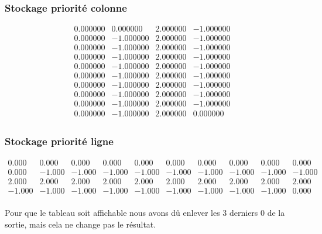 \documentclass[11pt]{article}
\begin{document}
\subsubsection{Stockage priorité colonne}

\begin{equation*}
  \begin{array}{rrrr}
    0.000000 &	0.000000  &	2.000000 &	-1.000000	\\
    0.000000 &	-1.000000 &	2.000000 &	-1.000000	\\
    0.000000 &	-1.000000 &	2.000000 &	-1.000000	\\
    0.000000 &	-1.000000 &	2.000000 &	-1.000000	\\
    0.000000 &	-1.000000 &	2.000000 &	-1.000000	\\
    0.000000 &	-1.000000 &	2.000000 &	-1.000000	\\
    0.000000 &	-1.000000 &	2.000000 &	-1.000000	\\
    0.000000 &	-1.000000 &	2.000000 &	-1.000000	\\
    0.000000 &	-1.000000 &	2.000000 &	-1.000000	\\
    0.000000 &	-1.000000 &	2.000000 &	0.000000	\\
  \end{array}
\end{equation*}

\subsubsection{Stockage priorité ligne}

\begin{equation*}
  \begin{array}{rrrrrrrrrr}
    0.000 &	0.000 &	0.000 &	0.000 &
    0.000 &	0.000 &	0.000 &	0.000 &
    0.000 &	0.000 \\	
    0.000 &	-1.000 &	-1.000 &	-1.000 &
    -1.000 &	-1.000 &	-1.000 &	-1.000 &
    -1.000 &	-1.000 \\
    2.000 &	2.000 &	2.000 &	2.000 &
    2.000 &	2.000 &	2.000 &	2.000 &
    2.000 &	2.000 \\	
    -1.000 &	-1.000 &	-1.000 &	-1.000 &
    -1.000 &	-1.000 &	-1.000 &	-1.000 &
    -1.000 &	0.000 \\
  \end{array}
\end{equation*}

Pour que le tableau soit affichable nous avons dû enlever les 3
derniers 0 de la sortie, mais cela ne change pas le résultat.
\end{document}
